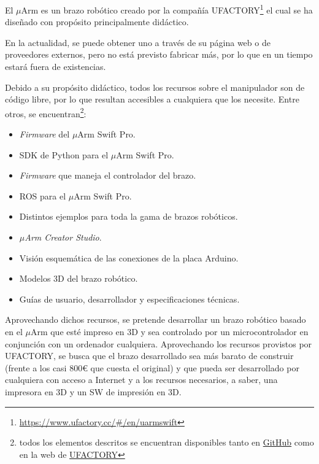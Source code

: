 El $\mu$Arm es un brazo robótico creado por la compañía UFACTORY\footnote{\url{https://www.ufactory.cc/\#/en/uarmswift}} el cual se ha diseñado con propósito principalmente didáctico.

En la actualidad, se puede obtener uno a través de su página web o de proveedores externos, pero no está previsto fabricar más, por lo que en un tiempo estará fuera de existencias.

Debido a su propósito didáctico, todos los recursos sobre el manipulador son de código libre, por lo que resultan accesibles a cualquiera que los necesite. Entre otros, se encuentran\footnote{todos los elementos descritos se encuentran disponibles tanto en \href{https://github.com/uArm-Developer}{GitHub} como en la web de \href{https://www.ufactory.cc/\#/en/support/download/pro}{UFACTORY}}:

\begin{itemize}
    \item \textit{Firmware} del $\mu$Arm Swift Pro.
    \item \ac{SDK} de Python para el $\mu$Arm Swift Pro.
    \item \textit{Firmware} que maneja el controlador del brazo.
    \item \ac{ROS} para el $\mu$Arm Swift Pro.
    \item Distintos ejemplos para toda la gama de brazos robóticos.
    \item \textit{$\mu$Arm Creator Studio}.
    \item Visión esquemática de las conexiones de la placa Arduino.
    \item Modelos 3D del brazo robótico.
    \item Guías de usuario, desarrollador y especificaciones técnicas.
\end{itemize}

Aprovechando dichos recursos, se pretende desarrollar un brazo robótico basado en el $\mu$Arm que esté impreso en 3D y sea controlado por un microcontrolador en conjunción con un ordenador cualquiera. Aprovechando los recursos provistos por UFACTORY, se busca que el brazo desarrollado sea más barato de construir (frente a los casi 800\euro{} que cuesta el original) y que pueda ser desarrollado por cualquiera con acceso a Internet y a los recursos necesarios, a saber, una impresora en 3D y un \ac{SW} de impresión en 3D.